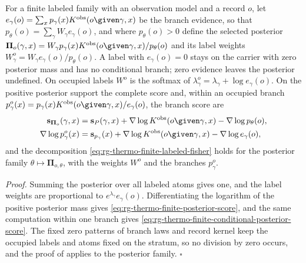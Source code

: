 \label{def:rg-thermo-finite-posterior}
\label{eq:rg-thermo-finite-evidence}
\label{eq:rg-thermo-finite-posterior}
\label{eq:rg-thermo-finite-posterior-labels}
For a finite labeled family with an observation model and a record $o$, let
$e_\gamma(o)=\sum_xp_\gamma(x)K^{\mathrm{obs}}(o\given\gamma,x)$ be the branch evidence, so that
$p_\theta(o)=\sum_\gamma W_\gamma e_\gamma(o)$, and where $p_\theta(o)>0$ define the selected
posterior $\boldsymbol\Pi_o(\gamma,x)=W_\gamma p_\gamma(x)K^{\mathrm{obs}}(o\given\gamma,x)/p_\theta(o)$
and its label weights $W^o_\gamma=W_\gamma e_\gamma(o)/p_\theta(o)$. A label with $e_\gamma(o)=0$
stays on the carrier with zero posterior mass and has no conditional
branch; zero evidence leaves the posterior undefined. On occupied labels $W^o$ is the softmax of
$\lambda^o_\gamma=\lambda_\gamma+\log e_\gamma(o)$. On the positive posterior support the complete
score and, within an occupied branch
$p^o_\gamma(x)=p_\gamma(x)K^{\mathrm{obs}}(o\given\gamma,x)/e_\gamma(o)$, the branch score are
\begin{align}
\mathbf s_{\boldsymbol\Pi_o}(\gamma,x)
&=\mathbf s_P(\gamma,x)+\nabla\log K^{\mathrm{obs}}(o\given\gamma,x)-\nabla\log p_\theta(o),
\label{eq:rg-thermo-finite-posterior-score}\\
\nabla\log p^o_\gamma(x)&=\mathbf s_{p_\gamma}(x)+\nabla\log K^{\mathrm{obs}}(o\given\gamma,x)
-\nabla\log e_\gamma(o),
\label{eq:rg-thermo-finite-conditional-posterior-score}
\end{align}
and the decomposition \eqref{eq:rg-thermo-finite-labeled-fisher} holds for the posterior family
$\theta\mapsto\boldsymbol\Pi_{o,\theta}$, with the weights $W^o$ and the branches $p^o_\gamma$.

\noindent\emph{Proof.}
Summing the posterior over all labeled atoms gives one, and the label weights
are proportional to $e^{\lambda_\gamma}e_\gamma(o)$. Differentiating the logarithm of the positive
posterior mass gives \eqref{eq:rg-thermo-finite-posterior-score}, and the same computation within
one branch gives \eqref{eq:rg-thermo-finite-conditional-posterior-score}. The fixed zero patterns of
branch laws and record kernel keep the occupied labels and atoms fixed on the stratum, so no
division by zero occurs, and the proof of  applies to the
posterior family. $\square$

